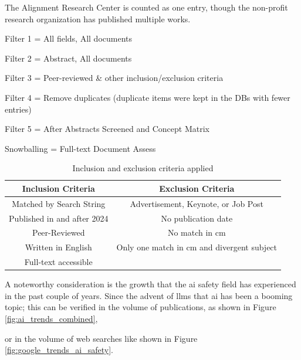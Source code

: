\begin{reviewed}
\begin{table}[htbp]
\begin{threeparttable}
\begin{tabular}{lcccccc}
				\bottomrule
			\end{tabular}
			\begin{tablenotes}
				\small
				\item[*] The Alignment Research Center is counted as one entry, though the non-profit research organization has published multiple works.
				\item Filter 1 = All fields, All documents
				\item Filter 2 = Abstract, All documents
				\item Filter 3 = Peer-reviewed \& other inclusion/exclusion criteria
				\item Filter 4 = Remove duplicates (duplicate items were kept in the DBs with fewer entries)
				\item Filter 5 = After Abstracts Screened and Concept Matrix
				\item Snowballing = Full-text Document Assess
			\end{tablenotes}
		\end{threeparttable}
	\end{table}

	\begin{table}[htbp]
		\centering
		\caption{Inclusion and exclusion criteria applied}
		\label{tab:inclusion_exclusion_criteria}
		\begin{tabular}{c c}
			\toprule
			\textbf{Inclusion Criteria} & \textbf{Exclusion Criteria}                \\
			\midrule
			Matched by Search String    & Advertisement, Keynote, or Job Post        \\
			Published in and after 2024 & No publication date                        \\
			Peer-Reviewed               & No match in \gls{cm}             \\
			Written in English          & Only one match in \gls{cm} and divergent subject \\
			Full-text accessible        &                                            \\
			\bottomrule
		\end{tabular}
	\end{table}

	A noteworthy consideration is the growth that the \gls{ai} safety field has experienced in the past couple of years. Since the advent of \glspl{llm} that \gls{ai} has been a booming topic; this can be verified in the volume of publications, as shown in Figure \ref{fig:ai_trends_combined}, \begin{toreview} or in the volume of web searches like shown in Figure \ref{fig:google_trends_ai_safety}. \end{toreview}


\end{reviewed}
